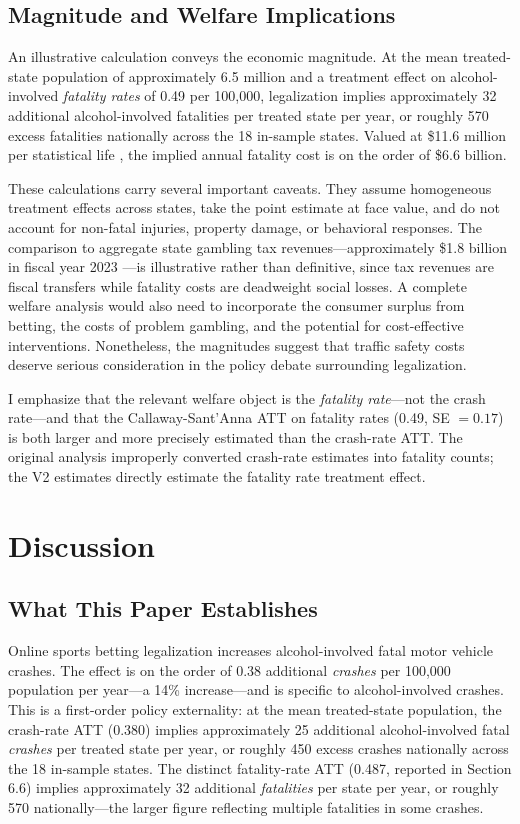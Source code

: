 \documentclass[12pt]{article}
\begin{document}
\subsection{Magnitude and Welfare Implications}

An illustrative calculation conveys the economic magnitude. At the mean treated-state population of approximately 6.5 million and a treatment effect on alcohol-involved \textit{fatality rates} of 0.49 per 100,000, legalization implies approximately 32 additional alcohol-involved fatalities per treated state per year, or roughly 570 excess fatalities nationally across the 18 in-sample states. Valued at \$11.6 million per statistical life \citep{USDOT2022}, the implied annual fatality cost is on the order of \$6.6 billion.

These calculations carry several important caveats. They assume homogeneous treatment effects across states, take the point estimate at face value, and do not account for non-fatal injuries, property damage, or behavioral responses. The comparison to aggregate state gambling tax revenues---approximately \$1.8 billion in fiscal year 2023 \citep{AGA2023}---is illustrative rather than definitive, since tax revenues are fiscal transfers while fatality costs are deadweight social losses. A complete welfare analysis would also need to incorporate the consumer surplus from betting, the costs of problem gambling, and the potential for cost-effective interventions. Nonetheless, the magnitudes suggest that traffic safety costs deserve serious consideration in the policy debate surrounding legalization.

I emphasize that the relevant welfare object is the \textit{fatality rate}---not the crash rate---and that the Callaway-Sant'Anna ATT on fatality rates (0.49, SE $= 0.17$) is both larger and more precisely estimated than the crash-rate ATT. The original analysis improperly converted crash-rate estimates into fatality counts; the V2 estimates directly estimate the fatality rate treatment effect.


\section{Discussion}

\subsection{What This Paper Establishes}

Online sports betting legalization increases alcohol-involved fatal motor vehicle crashes. The effect is on the order of 0.38 additional \textit{crashes} per 100,000 population per year---a 14\% increase---and is specific to alcohol-involved crashes. This is a first-order policy externality: at the mean treated-state population, the crash-rate ATT (0.380) implies approximately 25 additional alcohol-involved fatal \textit{crashes} per treated state per year, or roughly 450 excess crashes nationally across the 18 in-sample states. The distinct fatality-rate ATT (0.487, reported in Section 6.6) implies approximately 32 additional \textit{fatalities} per state per year, or roughly 570 nationally---the larger figure reflecting multiple fatalities in some crashes.
\end{document}
